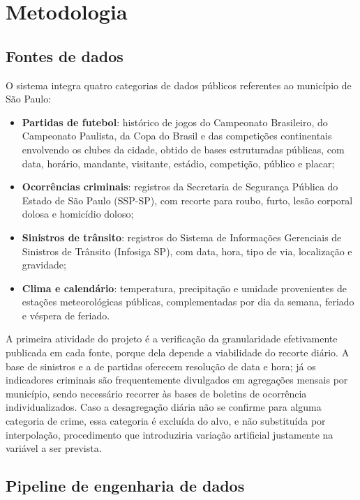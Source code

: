 \documentclass[12pt]{article}
\begin{document}
\section{Metodologia}

\subsection{Fontes de dados}

O sistema integra quatro categorias de dados públicos referentes ao município
de São Paulo:

\begin{itemize}
  \item \textbf{Partidas de futebol}: histórico de jogos do Campeonato
  Brasileiro, do Campeonato Paulista, da Copa do Brasil e das competições
  continentais envolvendo os clubes da cidade, obtido de bases estruturadas
  públicas, com data, horário, mandante, visitante, estádio, competição,
  público e placar;
  \item \textbf{Ocorrências criminais}: registros da Secretaria de Segurança
  Pública do Estado de São Paulo (SSP-SP), com recorte para roubo, furto, lesão
  corporal dolosa e homicídio doloso;
  \item \textbf{Sinistros de trânsito}: registros do Sistema de Informações
  Gerenciais de Sinistros de Trânsito (Infosiga SP), com data, hora, tipo de
  via, localização e gravidade;
  \item \textbf{Clima e calendário}: temperatura, precipitação e umidade
  provenientes de estações meteorológicas públicas, complementadas por dia da
  semana, feriado e véspera de feriado.
\end{itemize}

A primeira atividade do projeto é a verificação da granularidade efetivamente
publicada em cada fonte, porque dela depende a viabilidade do recorte diário. A
base de sinistros e a de partidas oferecem resolução de data e hora; já os
indicadores criminais são frequentemente divulgados em agregações mensais por
município, sendo necessário recorrer às bases de boletins de ocorrência
individualizados. Caso a desagregação diária não se confirme para alguma
categoria de crime, essa categoria é excluída do alvo, e não substituída por
interpolação, procedimento que introduziria variação artificial justamente na
variável a ser prevista.

\subsection{Pipeline de engenharia de dados}
\end{document}
